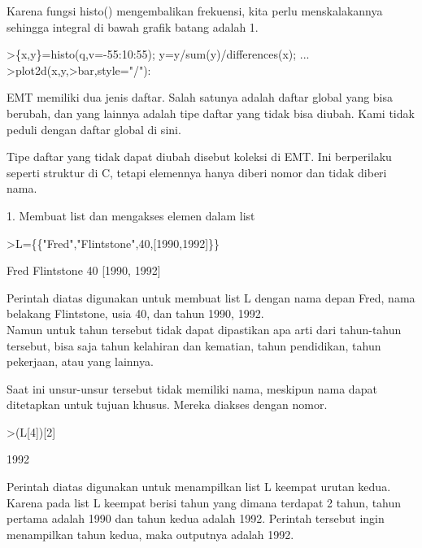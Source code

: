 \documentclass[a4paper,10pt]{article}
\begin{document}
\begin{eulernotebook}
\begin{eulercomment}
\begin{eulercomment}
\begin{eulercomment}
\begin{eulercomment}
\begin{eulercomment}
\begin{eulercomment}
\begin{eulercomment}
\begin{eulercomment}
\begin{eulercomment}
\begin{eulercomment}
\begin{eulercomment}
Karena fungsi histo() mengembalikan frekuensi, kita perlu
menskalakannya sehingga integral di bawah grafik batang adalah 1.
\end{eulercomment}
\begin{eulerprompt}
>\{x,y\}=histo(q,v=-55:10:55); y=y/sum(y)/differences(x); ...
>plot2d(x,y,>bar,style="/"):
\end{eulerprompt}
\begin{eulercomment}
\begin{eulercomment}
\begin{eulercomment}
EMT memiliki dua jenis daftar. Salah satunya adalah daftar global yang
bisa berubah, dan yang lainnya adalah tipe daftar yang tidak bisa
diubah. Kami tidak peduli dengan daftar global di sini.

Tipe daftar yang tidak dapat diubah disebut koleksi di EMT. Ini
berperilaku seperti struktur di C, tetapi elemennya hanya diberi nomor
dan tidak diberi nama.

1. Membuat list dan mengakses elemen dalam list
\end{eulercomment}
\begin{eulerprompt}
>L=\{\{"Fred","Flintstone",40,[1990,1992]\}\}
\end{eulerprompt}
\begin{euleroutput}
  Fred
  Flintstone
  40
  [1990,  1992]
\end{euleroutput}
\begin{eulercomment}
Perintah diatas digunakan untuk membuat list L dengan nama depan Fred,
nama belakang Flintstone, usia 40, dan tahun 1990, 1992.\\
Namun untuk tahun tersebut tidak dapat dipastikan apa arti dari
tahun-tahun tersebut, bisa saja tahun kelahiran dan kematian, tahun
pendidikan, tahun pekerjaan, atau yang lainnya.

Saat ini unsur-unsur tersebut tidak memiliki nama, meskipun nama dapat
ditetapkan untuk tujuan khusus. Mereka diakses dengan nomor.
\end{eulercomment}
\begin{eulerprompt}
>(L[4])[2]
\end{eulerprompt}
\begin{euleroutput}
  1992
\end{euleroutput}
\begin{eulercomment}
Perintah diatas digunakan untuk menampilkan list L keempat urutan
kedua. Karena pada list L keempat berisi tahun yang dimana terdapat 2
tahun, tahun pertama adalah 1990 dan tahun kedua adalah 1992. Perintah
tersebut ingin menampilkan tahun kedua, maka outputnya adalah 1992.


\end{eulercomment}
\end{eulercomment}
\end{eulercomment}
\end{eulercomment}
\end{eulercomment}
\end{eulercomment}
\end{eulercomment}
\end{eulercomment}
\end{eulercomment}
\end{eulercomment}
\end{eulercomment}
\end{eulercomment}
\end{eulercomment}
\end{eulernotebook}
\end{document}
